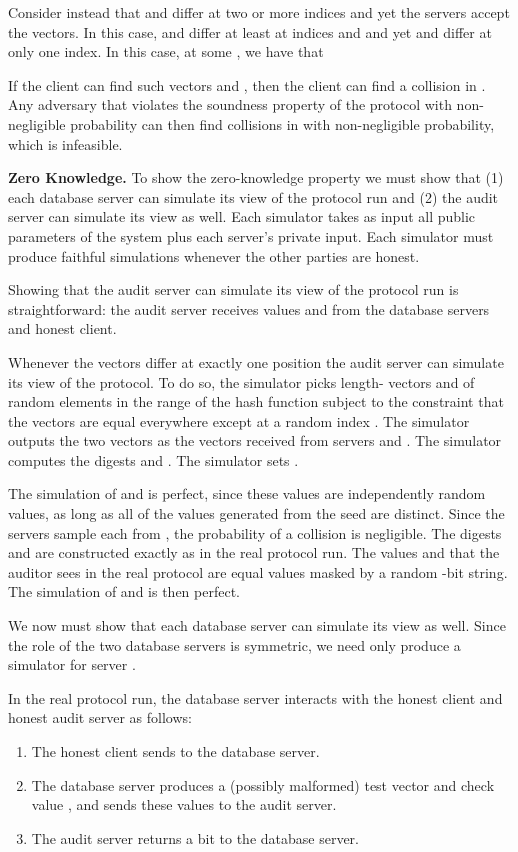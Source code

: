 \documentclass[10pt,twocolumn]{article}
\newcommand{\nicepara}[1]{\medskip\noindent\textbf{#1.}}
\begin{document}
Consider instead that  and  differ at two or more indices
and yet the servers accept the vectors.
In this case,  and  differ at least at indices
 and  and yet  and  differ at only one index.
In this case, at some , we have that

If the client can find 
such vectors  and , then the client can find a collision
in .
Any adversary that violates the soundness property of
the protocol with non-negligible probability can then 
find collisions in  with non-negligible probability,
which is infeasible.

\nicepara{Zero Knowledge}
To show the zero-knowledge property we must show
that 
(1) each database server can simulate its view
of the protocol run and 
(2) the audit server can simulate
its view as well.
Each simulator takes as input all public parameters of
the system plus each server's private input.
Each simulator must produce faithful simulations whenever
the other parties are honest.

\medskip

Showing that the audit server can simulate its view
of the protocol run is straightforward: the audit
server receives values  and 
from the database servers and honest client.

Whenever the vectors differ at exactly one position the audit
server can simulate its view of the protocol.
To do so, the simulator picks length-
vectors  and  of random elements in 
the range of the hash function 
subject to the constraint
that the vectors are equal everywhere except 
at a random index .
The simulator outputs the two vectors as
the vectors received from servers  and .
The simulator computes the digests 
and .
The simulator sets .

The simulation of  and  is perfect, since 
these values are independently random values, as long as
all of the values  generated from
the seed  are distinct.
Since the servers sample each  from , the
probability of a collision is negligible.
The digests  and  are constructed exactly as in the 
real protocol run.
The values  and  that the auditor sees
in the real protocol are equal values masked by a
random -bit string.
The simulation of  and  is then perfect.

\medskip

We now must show that each database server can simulate
its view as well.
Since the role of the two database servers is symmetric, we need only
produce a simulator for server .

In the real protocol run, the database server interacts
with the honest client and honest audit server as follows:
\begin{enumerate}
  \item The honest client sends  to the database server.
  \item The database server produces a (possibly malformed) test vector
     and check value , and sends these values to the audit server.
  \item The audit server returns a bit  to the database server.
\end{enumerate}
\end{document}

